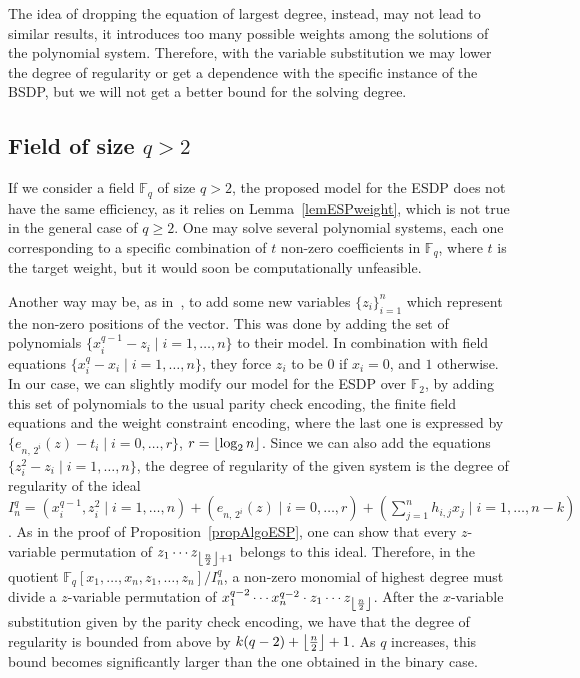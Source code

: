 \documentclass[11pt]{article}
\newcommand{\F}[0]{\mathbb{F}}
\newcommand{\es}[2]{e_{#1,\, #2}}
\DeclarePairedDelimiter{\fl}{\lfloor}{\rfloor}
\theoremstyle{plain}
\theoremstyle{definition}
\theoremstyle{remark}
\begin{document}
The idea of dropping the equation of largest degree, instead, may not lead to similar results, it introduces too many possible weights among the solutions of the polynomial system. Therefore, with the variable substitution we may lower the degree of regularity or get a dependence with the specific instance of the BSDP, but we will not get a better bound for the solving degree.

\subsection{Field of size $q>2$}\label{secSizeq>2}
If we consider a field $\F_q$ of size $q>2$, the proposed model for the ESDP does not have the same efficiency, as it relies on Lemma~\ref{lemESPweight}, which is not true in the general case of $q\geq 2$. One may solve several polynomial systems, each one corresponding to a specific combination of $t$ non-zero coefficients in $\F_q$, where $t$ is the target weight, but it would soon be computationally unfeasible. 

Another way may be, as in~\cite{caminata2025quadraticmodelingssyndromedecoding}, to add some new variables $\{z_i\}_{i=1}^n$ which represent the non-zero positions of the vector. This was done by adding the set of polynomials $\{x_i^{q-1}-z_i\mid i=1,\dots,n\}$ to their model. In combination with field equations $\{x_i^q-x_i\mid i=1,\dots,n\}$, they force $z_i$ to be $0$ if $x_i=0$, and $1$ otherwise. In our case, we can slightly modify our model for the ESDP over $\F_2$, by adding this set of polynomials to the usual parity check encoding, the finite field equations and the weight constraint encoding, where the last one is expressed by $\{\es{n}{2^i}(z)-t_i\mid i=0,\dots,r\}$, $r=\fl*{\operatorname{log}_2 n}$. Since we can also add the equations $\{z_i^2-z_i\mid i=1,\dots,n\}$, the degree of regularity of the given system is the degree of regularity of the ideal $I_n^q=(x_i^{q-1},z_i^2\mid i=1,\dots,n)+(\es{n}{2^i}(z)\mid i=0,\dots,r)+(\sum\limits_{j=1}^n h_{i,j}x_j\mid i=1,\dots,n-k)$. As in the proof of Proposition~\ref{propAlgoESP}, one can show that every $z$-variable permutation of $z_1\cdots z_{\fl*{\frac{n}{2}}+1}$ belongs to this ideal. Therefore, in the quotient $\F_q[x_1,\dots,x_n,z_1,\dots,z_n]/I_n^q$, a non-zero monomial of highest degree must divide a $z$-variable permutation of $x_1^{q-2}\cdots x_n^{q-2}\cdot z_1\cdots z_{\fl*{\frac{n}{2}}}$. After the $x$-variable substitution given by the parity check encoding, we have that the degree of regularity is bounded from above by $k(q-2)+\fl*{\frac{n}{2}}+1$. As $q$ increases, this bound becomes significantly larger than the one obtained in the binary case.\\
\end{document}
